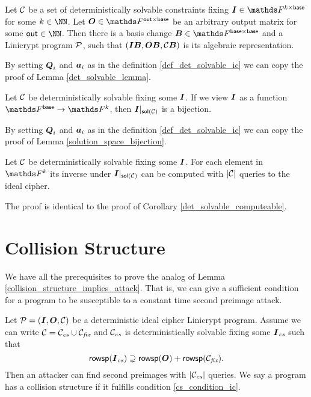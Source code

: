 \begin{lemma}
\label{det_solvable_lemma_ic}
    Let $\C$ be a set of deterministically solvable constraints fixing $\Inp \in \F^{k \times \base}$ for some $k \in \NN$.
    Let $\O \in \F^{\out \times \base}$ be an arbitrary output matrix for some $\out \in \NN$.
    Then there is a basis change $\B \in \F^{\base \times \base}$
    and a Linicrypt program $\P$,
    such that $(\Inp \B, \O \B, \C \B)$ is its algebraic representation.
\end{lemma}

\begin{sketch}
    By setting $\Q_i$ and $\va_i$ as in the definition \ref{def_det_solvable_ic} we can copy the proof of Lemma \ref{det_solvable_lemma}.
\end{sketch}

\begin{lemma}
\label{solution_space_bijection_ic}
    Let $\C$ be deterministically solvable fixing some $\I$.
    If we view $\I$ as a function $\Fsp \to \F^k$,
    then $\I|_{\sol(\C)}$ is a bijection.
\end{lemma}

\begin{sketch}
    By setting $\Q_i$ and $\va_i$ as in the definition \ref{def_det_solvable_ic} we can copy the proof of Lemma \ref{solution_space_bijection}.
\end{sketch}

\begin{corollary}
\label{det_solvable_computeable_ic}
    Let $\C$ be deterministically solvable fixing some $\I$.
    For each element in $\F^k$ its inverse under $\I|_{\sol(\C)}$ can be computed with $|\C|$ queries to the ideal cipher.
\end{corollary}

\begin{sketch}
    The proof is identical to the proof of Corollary \ref{det_solvable_computeable}.
\end{sketch}

\section{Collision Structure}

We have all the prerequisites to prove the analog of Lemma \ref{collision_structure_implies_attack}.
That is, we can give a sufficient condition for a program to be susceptible to a constant time second preimage attack.

\begin{lemma}
\label{collision_structure_implies_attack_ic}
    Let $\P = (\I, \O, \C)$ be a deterministic ideal cipher Linicrypt program.
    Assume we can write $\C = \Ccs \cup \Cfix$ and
    $\Ccs$ is deterministically solvable fixing some $\Ics$ such that
    \begin{equation}
    \label{cs_condition_ic}
        \rowsp(\Ics) \supsetneq \rowsp(\O) + \rowsp(\Cfix).
    \end{equation}
    Then an attacker can find second preimages with $|\Ccs|$ queries.
    We say a program has a collision structure if it fulfills condition \eqref{cs_condition_ic}.
\end{lemma}

